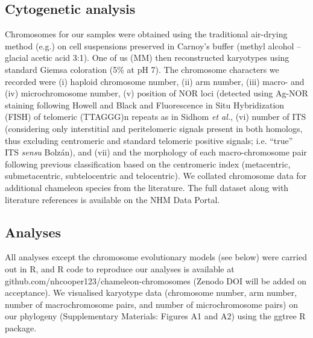\documentclass[a4paper, 12pt]{article}
\begin{document}
\subsection{Cytogenetic analysis}
Chromosomes for our samples were obtained using the traditional air-drying method (e.g.\cite{sidhom2020karyological}) on cell suspensions preserved in Carnoy’s buffer (methyl alcohol – glacial acetic acid 3:1). 
One of us (MM) then reconstructed karyotypes using standard Giemsa coloration (5\% at pH 7). 
The chromosome characters we recorded were (i) haploid chromosome number, (ii) arm number, (iii) macro- and (iv) microchromosome number, (v) position of NOR loci (detected using Ag-NOR staining following Howell and Black\cite{howell1980controlled} and Fluorescence in Situ Hybridization (FISH) of telomeric (TTAGGG)n repeats as in Sidhom \textit{et al.}\cite{sidhom2020karyological}, (vi) number of ITS (considering only interstitial and peritelomeric signals present in both homologs, thus excluding centromeric and standard telomeric positive signals; i.e. “true” ITS \textit{sensu} Bolz\'{a}n\cite{bolzan2012chromosomal,chirino2017chromosomal}), and (vii) and the morphology of each macro-chromosome pair following previous classification based on the centromeric index (metacentric, submetacentric, subtelocentric and telocentric\cite{levan1964nomenclature}). 
We collated chromosome data for additional chameleon species from the literature. 
The full dataset along with literature references is available on the NHM Data Portal\cite{chameleon-data}.

\subsection{Analyses}
All analyses except the chromosome evolutionary models (see below) were carried out in R\cite{R}, and R code to reproduce our analyses is available at github.com/nhcooper123/chameleon-chromosomes (Zenodo DOI will be added on acceptance\cite{coopercode2022}). 
We visualised karyotype data (chromosome number, arm number, number of macrochromosome pairs, and number of microchromosome pairs) on our phylogeny (Supplementary Materials: Figures A1 and A2) using the ggtree R package\cite{yu2017ggtree}.
\end{document}
